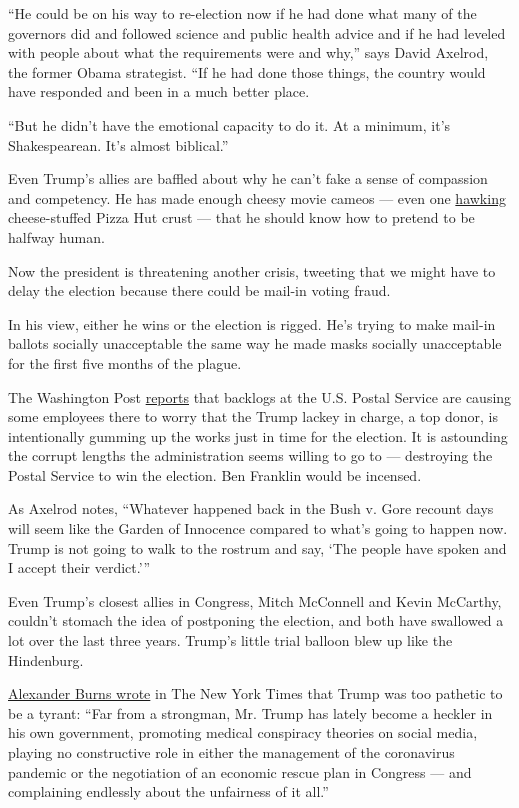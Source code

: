 ``He could be on his way to re-election now if he had done what many of
the governors did and followed science and public health advice and if
he had leveled with people about what the requirements were and why,''
says David Axelrod, the former Obama strategist. ``If he had done those
things, the country would have responded and been in a much better
place.

``But he didn't have the emotional capacity to do it. At a minimum, it's
Shakespearean. It's almost biblical.''

Even Trump's allies are baffled about why he can't fake a sense of
compassion and competency. He has made enough cheesy movie cameos ---
even one \href{https://www.youtube.com/watch?v=QVmAcULPMu4}{hawking}
cheese-stuffed Pizza Hut crust --- that he should know how to pretend to
be halfway human.

Now the president is threatening another crisis, tweeting that we might
have to delay the election because there could be mail-in voting fraud.

In his view, either he wins or the election is rigged. He's trying to
make mail-in ballots socially unacceptable the same way he made masks
socially unacceptable for the first five months of the plague.

The Washington Post
\href{https://www.washingtonpost.com/politics/postal-service-backlog-sparks-worries-that-ballot-delivery-could-be-delayed-in-november/2020/07/30/cb19f1f4-d1d0-11ea-8d32-1ebf4e9d8e0d_story.html}{reports}
that backlogs at the U.S. Postal Service are causing some employees
there to worry that the Trump lackey in charge, a top donor, is
intentionally gumming up the works just in time for the election. It is
astounding the corrupt lengths the administration seems willing to go to
--- destroying the Postal Service to win the election. Ben Franklin
would be incensed.

As Axelrod notes, ``Whatever happened back in the Bush v. Gore recount
days will seem like the Garden of Innocence compared to what's going to
happen now. Trump is not going to walk to the rostrum and say, `The
people have spoken and I accept their verdict.'''

Even Trump's closest allies in Congress, Mitch McConnell and Kevin
McCarthy, couldn't stomach the idea of postponing the election, and both
have swallowed a lot over the last three years. Trump's little trial
balloon blew up like the Hindenburg.

\href{https://www.nytimes.com/2020/07/30/us/politics/trump-delay-election.html}{Alexander
Burns wrote} in The New York Times that Trump was too pathetic to be a
tyrant: ``Far from a strongman, Mr. Trump has lately become a heckler in
his own government, promoting medical conspiracy theories on social
media, playing no constructive role in either the management of the
coronavirus pandemic or the negotiation of an economic rescue plan in
Congress --- and complaining endlessly about the unfairness of it all.''


